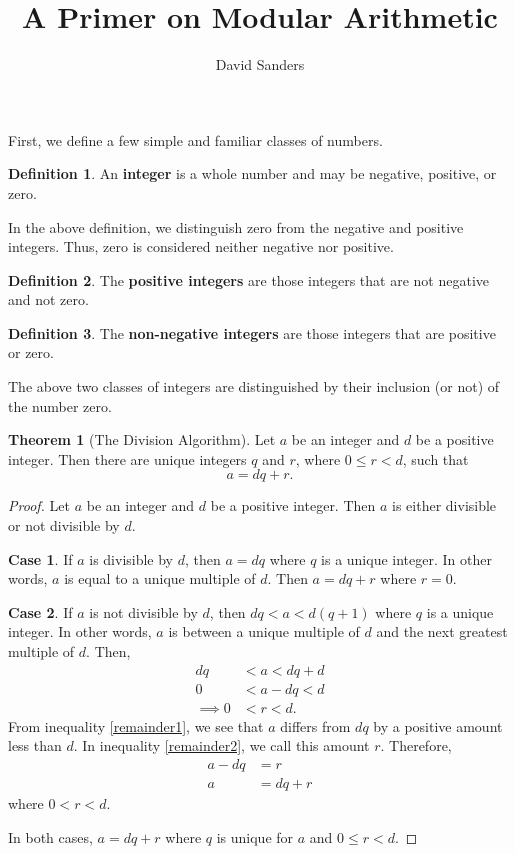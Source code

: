 \documentclass[letterpaper]{article}
\title{A Primer on Modular Arithmetic}
\author{David Sanders}
\theoremstyle{definition}
\newtheorem{theorem}{Theorem}
\newtheorem{definition}{Definition}
\theoremstyle{case}
\newtheorem{case}{Case}
\begin{document}
\maketitle

First, we define a few simple and familiar classes of numbers.

\begin{definition}
  An \textbf{integer} is a whole number and may be negative, positive, or zero.
\end{definition}

In the above definition, we distinguish zero from the negative and positive
integers.  Thus, zero is considered neither negative nor positive.

\begin{definition}
  The \textbf{positive integers} are those integers that are not negative and not zero.
\end{definition}

\begin{definition}
  The \textbf{non-negative integers} are those integers that are positive or zero.
\end{definition}

The above two classes of integers are distinguished by their inclusion (or not)
of the number zero.

\begin{theorem}[The Division Algorithm]
  \label{division}
  Let $a$ be an integer and $d$ be a positive integer.  Then there are unique
  integers $q$ and $r$, where $0 \le r < d$, such that
  \[ a = dq + r. \]
\end{theorem}

\begin{proof}
  Let $a$ be an integer and $d$ be a positive integer.  Then $a$ is either
  divisible or not divisible by $d$.
  \begin{case}
    If $a$ is divisible by $d$, then $a = dq$ where $q$ is a unique integer.
    In other words, $a$ is equal to a unique multiple of $d$.  Then $a = dq +
    r$ where $r = 0$.
  \end{case}
  \begin{case}
    If $a$ is not divisible by $d$, then $dq < a < d(q + 1)$ where $q$ is a
    unique integer.  In other words, $a$ is between a unique multiple of $d$
    and the next greatest multiple of $d$.  Then,
    \begin{align}
      dq &< a < dq + d \nonumber \\
      0 &< a - dq < d \label{remainder1} \\
      \implies 0 &< r < d. \label{remainder2}
    \end{align}
    From inequality \ref{remainder1}, we see that $a$ differs from $dq$ by a
    positive amount less than $d$.  In inequality \ref{remainder2}, we call
    this amount $r$.  Therefore,
    \begin{align*}
      a - dq &= r \\
      a &= dq + r
    \end{align*}
    where $0 < r < d$.
  \end{case}
  In both cases, $a = dq + r$ where $q$ is unique for $a$ and $0 \le r < d$.
\end{proof}
\end{document}
